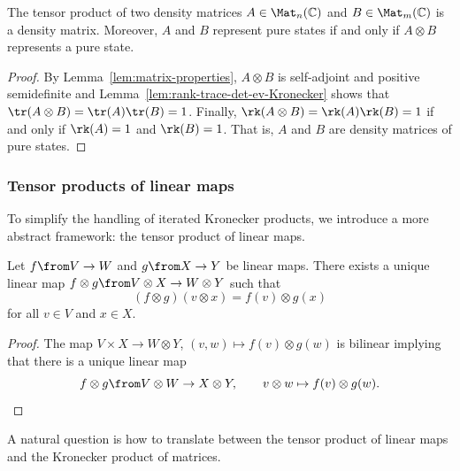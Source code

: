 \documentclass[a4paper,oneside, 12pt]{amsart}
\begin{document}
\begin{corollary}\label{cor:tensor-product-of-density-matrices}
  The tensor product of two density matrices \( A \in \Mat_{n}(\mathbb{C}) \) and \( B \in \Mat_{m}(\mathbb{C}) \) is a density matrix.
  Moreover, \(A\) and \(B\) represent pure states if and only if  \(A\otimes B\) represents a pure state.
\end{corollary}
\begin{proof}
  By Lemma~\ref{lem:matrix-properties}, \( A \otimes B \) is self-adjoint and positive semidefinite and Lemma~\ref{lem:rank-trace-det-ev-Kronecker} shows that \(\tr(A\otimes B) = \tr(A)\tr(B) = 1\).
  Finally, \(\rk(A\otimes B) = \rk(A)\rk(B) = 1\) if and only if \(\rk(A) = 1\) and \(\rk(B)=1\).
  That is, \(A\) and \(B\) are density matrices of pure states.
\end{proof}

\subsubsection{Tensor products of linear maps}\label{sec:tensor-products-of-linear-maps}

To simplify the handling of iterated Kronecker products, we introduce a more abstract framework: the tensor product of linear maps.

\begin{lemma}\label{lem:existence}
  Let \( f \from V \to W \) and \( g \from X \to Y \) be linear maps.
  There exists a unique linear map \( f \otimes g \from V \otimes X \to W \otimes Y \) such that
  \begin{equation}
    (f \otimes g)(v \otimes x) = f(v) \otimes g(x)
  \end{equation}
  for all \( v \in V \) and \( x \in X \).
\end{lemma}
\begin{proof}
  The map \(V\times X \to W\otimes Y\), \((v, w) \mapsto f(v) \otimes g(w)\) is bilinear implying that there is a unique linear map
  \begin{equation*}
    f\otimes g \from V\otimes W \to X\otimes Y, \qquad v\otimes w \mapsto f(v) \otimes g(w). \qedhere
  \end{equation*}
\end{proof}

A natural question is how to translate between the tensor product of linear maps and the Kronecker product of matrices.
\end{document}
